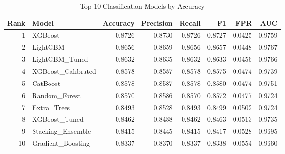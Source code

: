 \begin{table}
\caption{Top 10 Classification Models by Accuracy}
\label{tab:classification_results}
\begin{tabular}{rlrrrrrr}
\toprule
Rank & Model & Accuracy & Precision & Recall & F1 & FPR & AUC \\
\midrule
1 & XGBoost & 0.8726 & 0.8730 & 0.8726 & 0.8727 & 0.0425 & 0.9759 \\
2 & LightGBM & 0.8656 & 0.8659 & 0.8656 & 0.8657 & 0.0448 & 0.9767 \\
3 & LightGBM_Tuned & 0.8632 & 0.8635 & 0.8632 & 0.8633 & 0.0456 & 0.9766 \\
4 & XGBoost_Calibrated & 0.8578 & 0.8587 & 0.8578 & 0.8575 & 0.0474 & 0.9739 \\
5 & CatBoost & 0.8578 & 0.8587 & 0.8578 & 0.8580 & 0.0474 & 0.9751 \\
6 & Random_Forest & 0.8570 & 0.8586 & 0.8570 & 0.8572 & 0.0477 & 0.9724 \\
7 & Extra_Trees & 0.8493 & 0.8528 & 0.8493 & 0.8499 & 0.0502 & 0.9724 \\
8 & XGBoost_Tuned & 0.8462 & 0.8488 & 0.8462 & 0.8463 & 0.0513 & 0.9735 \\
9 & Stacking_Ensemble & 0.8415 & 0.8445 & 0.8415 & 0.8417 & 0.0528 & 0.9695 \\
10 & Gradient_Boosting & 0.8337 & 0.8370 & 0.8337 & 0.8338 & 0.0554 & 0.9660 \\
\bottomrule
\end{tabular}
\end{table}
